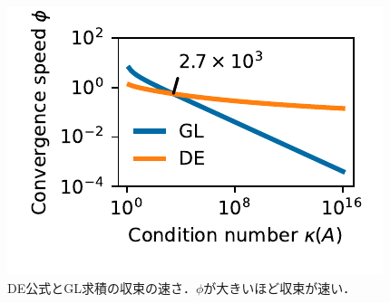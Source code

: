 \documentclass[12pt,a4paper,uplatex,dvipdfmx]{jsarticle}
\begin{document}
  \begin{figure}[htbp]
    \centering
    \includegraphics{src/fig-convspeed.pdf}
    \caption{DE公式とGL求積の収束の速さ．$\phi$が大きいほど収束が速い．}
    \label{fig:convspeed}
  \end{figure}
\end{document}
